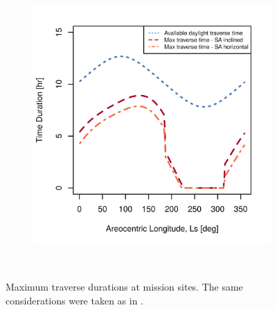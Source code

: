 \begin{figure}[h]
\begin{subfigure}[t]{\subfigureWidth}
        \includegraphics[height=\graphicsHeight]{sections/power-system-design/solar-array/plots/ismeniuscavus-75w-max-traverse-durations-for-solar-cell-coverage-area-24m2.png}
		\label{fig:plot:sub:final-maximum-traverse-durations-ismenius-cavus}
	\end{subfigure}\\[0.8ex]
    \caption[Maximum traverse durations at mission sites]
            {Maximum traverse durations at mission sites. The same considerations were taken as in .}
    \label{fig:plot:final-maximum-traverse-durations-at-missions-sites}
\vspace{-2ex}
\end{figure}



\clearpage
